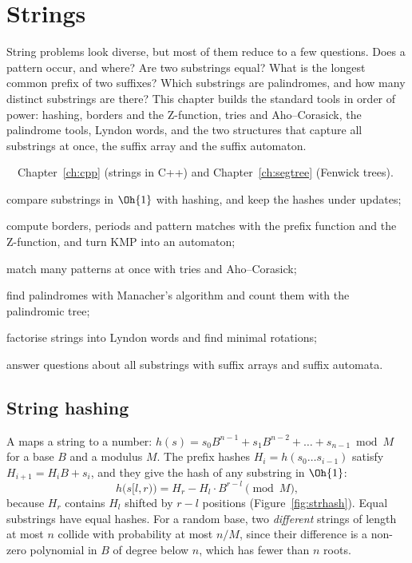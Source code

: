 \chapter{Strings}\label{ch:strings}

String problems look diverse, but most of them reduce to a few questions. Does a pattern occur, and where? Are two substrings equal?
What is the longest common prefix of two suffixes? Which substrings are palindromes, and how many distinct substrings are there? This
chapter builds the standard tools in order of power: hashing, borders and the Z-function, tries and Aho--Corasick, the palindrome
tools, Lyndon words, and the two structures that capture all substrings at once, the suffix array and the suffix automaton.

\begin{chapterintro}{\gold\ \plat\ \ioi}{Chapter~\ref{ch:cpp} (strings in C++) and Chapter~\ref{ch:segtree} (Fenwick trees).}
  \item compare substrings in $\Oh{1}$ with hashing, and keep the hashes under updates;
  \item compute borders, periods and pattern matches with the prefix function and the Z-function, and turn KMP into an automaton;
  \item match many patterns at once with tries and Aho--Corasick;
  \item find palindromes with Manacher's algorithm and count them with the palindromic tree;
  \item factorise strings into Lyndon words and find minimal rotations;
  \item answer questions about all substrings with suffix arrays and suffix automata.
\end{chapterintro}

\section[String hashing]{String hashing \hfill \gold}\label{sec:strhash}

A  maps a string to a number: $h(s) = s_0 B^{n-1} + s_1 B^{n-2} + \dots + s_{n-1} \bmod M$ for a base $B$ and a
modulus $M$. The prefix hashes $H_i = h(s_0 \dots s_{i-1})$ satisfy $H_{i+1} = H_i B + s_i$, and they give the hash of any substring in
$\Oh{1}$:
\[
  h\bigl(s[l, r)\bigr) = H_r - H_l \cdot B^{r - l} \pmod M ,
\]
because $H_r$ contains $H_l$ shifted by $r - l$ positions (Figure~\ref{fig:strhash}). Equal substrings have equal hashes. For a random
base, two \emph{different} strings of length at most $n$ collide with probability at most $n / M$, since their difference is a non-zero
polynomial in $B$ of degree below $n$, which has fewer than $n$ roots.

